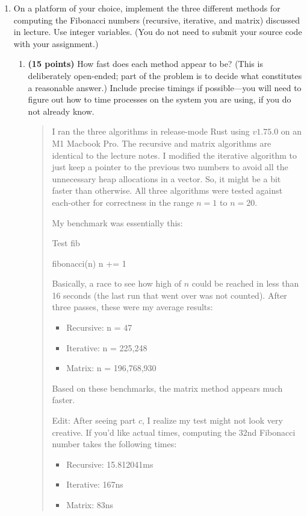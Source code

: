 \documentclass[11pt]{article}
\begin{document}
\begin{enumerate}[leftmargin=*]
\item
On a platform of your choice, implement the three different methods for computing the Fibonacci
numbers (recursive, iterative, and matrix) discussed in lecture. Use integer variables. (You do not need to submit your source code with your assignment.)
\begin{enumerate}
\item
{\bf (15 points)}
How fast does
each method appear to be? (This is deliberately open-ended; part of the problem is to decide what constitutes a reasonable answer.)
Include precise timings if possible---you will need to figure out how to time processes on the system
you are using, if you do not already know.
\begin{quote}
  \color{purple}
  I ran the three algorithms in release-mode Rust using $v1.75.0$ on an M1 Macbook Pro. The recursive and matrix algorithms are identical to the lecture notes. I modified the iterative algorithm to just keep a pointer to the previous two numbers to avoid all the unnecessary heap allocations in a vector. So, it might be a bit faster than otherwise. All three algorithms were tested against each-other for correctness in the range $n = 1$ to $n = 20$. 

  \medskip
  My benchmark was essentially this:
  \begin{algorithm}
  \caption{Test fib}
  \begin{algorithmic}
          \STATE fibonacci(n)
          \STATE n += 1
      \ENDFOR
  \ENDFOR
  \end{algorithmic}
  \end{algorithm}

  Basically, a race to see how high of $n$ could be reached in less than 16 seconds (the last run that went over was not counted). After three passes, these were my average results:
  \begin{itemize}
    \item Recursive: n = 47
    \item Iterative: n = 225,248
    \item Matrix: n = 196,768,930
  \end{itemize}

  Based on these benchmarks, the matrix method appears much faster. 
  
  \medskip
  Edit: After seeing part $c$, I realize my test might not look very creative. If you'd like actual times, computing the $32$nd Fibonacci number takes the following times:
  \begin{itemize}
    \item Recursive: 15.812041ms
    \item Iterative: 167ns
    \item Matrix: 83ns
  \end{itemize}


\end{quote}
\end{enumerate}
\end{enumerate}
\end{document}

